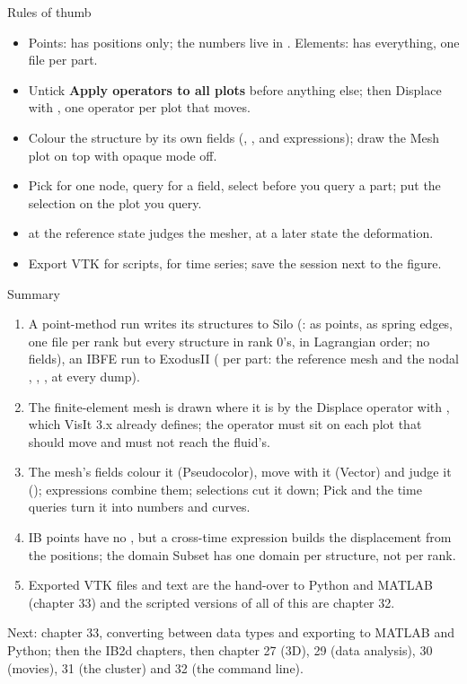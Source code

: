 \documentclass[aspectratio=169,11pt]{beamer}
\newcommand{\gui}[1]{\textsf{\textbf{#1}}}
\begin{document}
\begin{frame}{Rules of thumb}
\label{fr:thumb}
\small
\begin{itemize}
  \item Points:  has positions only; the numbers live in . Elements:  has everything, one file per part.
  \item Untick \gui{Apply operators to all plots} before anything else; then Displace with , one operator per plot that moves.
  \item Colour the structure by its own fields (, ,  and expressions); draw the Mesh plot on top with opaque mode off.
  \item Pick for one node, query for a field, select before you query a part; put the selection on the plot you query.
  \item {} at the reference state judges the mesher, at a later state the deformation.
  \item Export VTK for scripts,  for time series; save the session next to the figure.
\end{itemize}
\end{frame}

\begin{frame}{Summary}
\label{fr:summary}
\footnotesize
\begin{enumerate}
  \item A point-method run writes its structures to Silo (:  as points,  as spring edges, one file per rank but every structure in rank 0's, in Lagrangian order; no fields), an IBFE run to ExodusII ( per part: the reference mesh and the nodal , , ,  at every dump).
  \item The finite-element mesh is drawn where it is by the Displace operator with , which VisIt 3.x already defines; the operator must sit on each plot that should move and must not reach the fluid's.
  \item The mesh's fields colour it (Pseudocolor), move with it (Vector) and judge it (); expressions combine them; selections cut it down; Pick and the time queries turn it into numbers and curves.
  \item IB points have no , but a cross-time expression builds the displacement from the positions; the domain Subset has one domain per structure, not per rank.
  \item Exported VTK files and  text are the hand-over to Python and MATLAB (chapter 33) and the scripted versions of all of this are chapter 32.
\end{enumerate}
\begin{homebox}
\footnotesize Next: chapter 33, converting between data types and exporting to MATLAB and Python; then the IB2d chapters, then chapter 27 (3D), 29 (data analysis), 30 (movies), 31 (the cluster) and 32 (the command line).
\end{homebox}
\end{frame}
\end{document}
